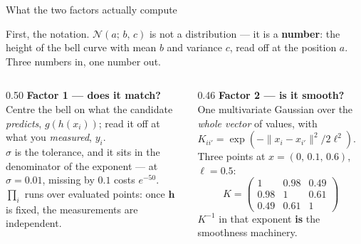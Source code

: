 \documentclass[aspectratio=169,11pt]{beamer}
\newcommand{\Norm}{\mathcal{N}}
\begin{document}
\begin{frame}[shrink=6]{What the two factors actually compute}

First, the notation. $\Norm(a;\,b,\,c)$ is not a distribution --- it is a
\textbf{number}: the height of the bell curve with mean $b$ and variance $c$,
read off at the position $a$. Three numbers in, one number out.

\bigskip
\begin{columns}[T]
\begin{column}{0.50\textwidth}
\textbf{Factor 1 --- does it match?}\\[4pt]
Centre the bell on what the candidate \emph{predicts}, $g(h(x_i))$; read it off
at what you \emph{measured}, $y_i$.\\[5pt]
$\sigma$ is the tolerance, and it sits in the denominator of the exponent --- at
$\sigma=0.01$, missing by $0.1$ costs $e^{-50}$.\\[5pt]
$\textstyle\prod_i$ runs over evaluated points: once $\mathbf h$ is fixed, the
measurements are independent.
\end{column}
\begin{column}{0.46\textwidth}
\textbf{Factor 2 --- is it smooth?}\\[4pt]
One multivariate Gaussian over the \emph{whole vector} of values, with
$K_{ii'}=\exp(-\|x_i-x_{i'}\|^2/2\ell^2)$.\\[3pt]
Three points at $x=(0,\,0.1,\,0.6)$, $\ell=0.5$:
\[
K=\begin{pmatrix}1 & 0.98 & 0.49\\ 0.98 & 1 & 0.61\\ 0.49 & 0.61 & 1\end{pmatrix}
\]
$K^{-1}$ in that exponent \textbf{is} the smoothness machinery.
\end{column}
\end{columns}

\end{frame}
\end{document}
